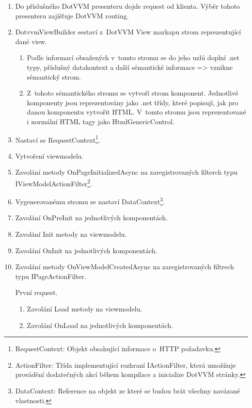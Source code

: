 \begin{enumerate}
    \item Do příslušného DotVVM presenteru dojde request od klienta. Výběr tohoto presenteru zajišťuje DotVVM routing.
    \item DotvvmViewBuilder sestaví z~DotVVM View markapu strom reprezentující dané view. 
    \begin{enumerate}[label*=\arabic*.]
        \item Podle informací obsažených v~tomto stromu se do jeho uzlů doplní .net typy, příslušný datakontext a další sémantické informace => vznikne sémantický strom.
        \item Z~tohoto sémantického stromu se vytvoří strom komponent. Jednotlivé komponenty jsou reprezentovány jako .net třídy, které popisují, jak pro danou komponentu vytvořit HTML. V~tomto stromu jsou reprezentované i normální HTML tagy jako HtmlGenericControl.
    \end{enumerate}
    \item Nastaví se RequestContext\footnote{RequestContext: Objekt obsahující informace o~HTTP požadavku.}.
    \item Vytvoření viewmodelu.
    \item Zavolání metody OnPageInitializedAsync na zaregistrovaných filterch typu IViewModelActionFilter\footnote{\label{ActionFilterNote}ActionFilter: Třída implementující rozhraní IActionFilter, která umožňuje provádění dodatečných akcí během kompilace a inicialize DotVVM stránky. }.
    \item Vygenerovanému stromu se nastaví DataContext\footnote{\label{DataContext}DataContext: Reference na objekt ze které se budou brát všechny navázané vlastnosti.}.
    \item Zavolání OnPreInit na jednotlivých komponentách.
    \item Zavolání Init metody na viewmodelu.
    \item Zavolání OnInit na jednotlivých komponentách.
    \item Zavolání metody OnViewModelCreatedAsync na zaregistrovaných filtrech typu IPageActionFilter.
    \pagebreak
    \begin{multicols}{2}
        První request.
        \begin{enumerate}[label*=\arabic*.]
            \item Zavolání Load metody na viewmodelu.
            \item Zavolání OnLoad na jednotlivých komponentách.
        \end{enumerate}

\end{multicols}
\end{enumerate}
